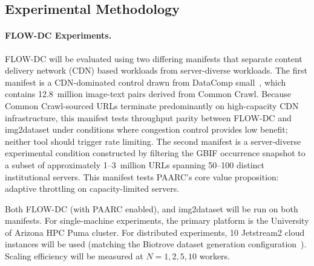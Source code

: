 \documentclass[11pt, letterpaper]{article}
\begin{document}
\subsection{Experimental Methodology}
\label{sec:methodology}

\paragraph{FLOW-DC Experiments.}
FLOW-DC will be evaluated using two differing manifests that
separate content delivery network (CDN) based workloads from server-diverse workloads. The first
manifest is a CDN-dominated control drawn from DataComp
small~\cite{gadre2023datacomp}, which contains 12.8~million image-text pairs
derived from Common Crawl. Because Common Crawl-sourced URLs terminate
predominantly on high-capacity CDN infrastructure, this manifest tests
throughput parity between FLOW-DC and img2dataset under conditions where
congestion control provides low benefit; neither tool should trigger rate
limiting. The second manifest is a server-diverse experimental condition
constructed by filtering the GBIF occurrence snapshot to a subset of
approximately 1--3~million URLs spanning 50--100 distinct institutional
servers. This manifest tests PAARC's core value
proposition: adaptive throttling on capacity-limited servers.

Both FLOW-DC (with PAARC enabled), and
img2dataset will be run on both manifests.
For single-machine experiments, the primary platform is the University of
Arizona HPC Puma cluster. For distributed
experiments, 10 Jetstream2 cloud instances will be used (matching the Biotrove dataset generation
configuration~\cite{deng2025flowdc}). Scaling efficiency will be measured at
$N = 1, 2, 5, 10$ workers.
\end{document}
